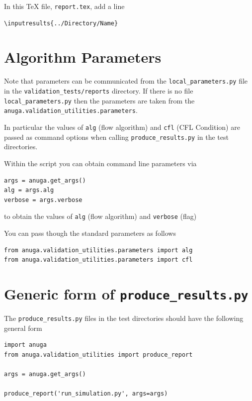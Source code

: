 \documentclass[11pt,a4paper]{report}
\begin{document}
In this \TeX{} file, \texttt{report.tex}, add a line
\begin{verbatim}
\inputresults{../Directory/Name}
\end{verbatim}



\section{Algorithm Parameters}
Note that parameters can be communicated from the \verb|local_parameters.py|
file in the \verb|validation_tests/reports| directory. If there is no file
\verb|local_parameters.py| then the parameters are taken from the
\verb|anuga.validation_utilities.parameters|.

In particular the
values of \verb|alg| (flow algorithm) and \verb|cfl| (CFL Condition)
are passed as command options when calling \verb|produce_results.py| in the
test directories.

Within the \anuga{} script you can obtain command line parameters via
\begin{verbatim}
args = anuga.get_args()
alg = args.alg
verbose = args.verbose
\end{verbatim}
to obtain the values of \verb|alg| (flow algorithm) and \verb|verbose| (flag)

You can pass though the standard parameters as follows
\begin{verbatim}
from anuga.validation_utilities.parameters import alg
from anuga.validation_utilities.parameters import cfl
\end{verbatim}

\pagebreak
\section{Generic form of \texttt{produce\_results.py}}

The \texttt{produce\_results.py} files in the test directories should have the
following general form

\begin{verbatim}
import anuga
from anuga.validation_utilities import produce_report

args = anuga.get_args()

produce_report('run_simulation.py', args=args)
\end{verbatim}





\end{document}
